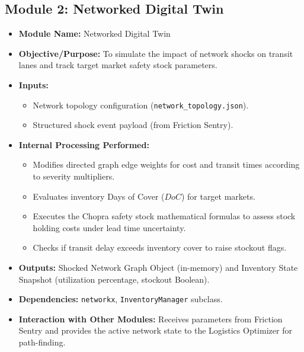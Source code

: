 \subsection[Module 2: Networked Digital Twin]{Module 2: Networked Digital Twin}
\begin{itemize}
    \item \textbf{Module Name:} Networked Digital Twin
    \item \textbf{Objective/Purpose:} To simulate the impact of network shocks on transit lanes and track target market safety stock parameters.
    \item \textbf{Inputs:}
    \begin{itemize}
        \item Network topology configuration (\texttt{network\_topology.json}).
        \item Structured shock event payload (from Friction Sentry).
    \end{itemize}
    \item \textbf{Internal Processing Performed:}
    \begin{itemize}
        \item Modifies directed graph edge weights for cost and transit times according to severity multipliers.
        \item Evaluates inventory Days of Cover ($DoC$) for target markets.
        \item Executes the Chopra safety stock mathematical formulas to assess stock holding costs under lead time uncertainty.
        \item Checks if transit delay exceeds inventory cover to raise stockout flags.
    \end{itemize}
    \item \textbf{Outputs:} Shocked Network Graph Object (in-memory) and Inventory State Snapshot (utilization percentage, stockout Boolean).
    \item \textbf{Dependencies:} \texttt{networkx}, \texttt{InventoryManager} subclass.
    \item \textbf{Interaction with Other Modules:} Receives parameters from Friction Sentry and provides the active network state to the Logistics Optimizer for path-finding.
\end{itemize}

